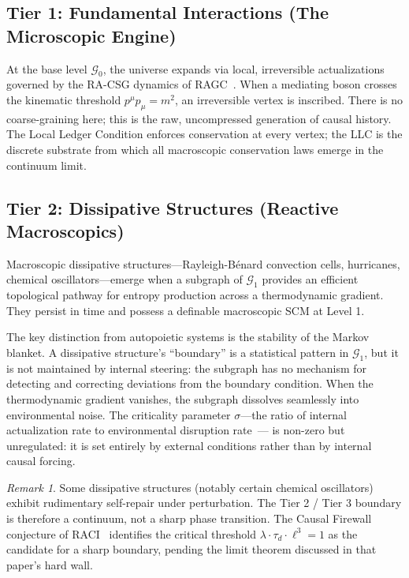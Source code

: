 \documentclass[11pt,a4paper]{article}
\theoremstyle{remark}
\newtheorem{remark}[theorem]{Remark}
\newcommand{\GG}{\mathcal{G}}
\newcommand{\sigmaedge}{\sigma}
\begin{document}
\subsection{Tier 1: Fundamental Interactions (The Microscopic Engine)}

At the base level $\GG_0$, the universe expands via local, irreversible
actualizations governed by the RA-CSG dynamics of RAGC~\citep{Sandeman2026b}.
When a mediating boson crosses the kinematic threshold $p^{\mu}p_{\mu} = m^2$,
an irreversible vertex is inscribed. There is no coarse-graining here; this is
the raw, uncompressed generation of causal history. The Local Ledger Condition
enforces conservation at every vertex; the LLC is the discrete substrate from
which all macroscopic conservation laws emerge in the continuum limit.

\subsection{Tier 2: Dissipative Structures (Reactive Macroscopics)}

Macroscopic dissipative structures---Rayleigh-B\'{e}nard convection cells,
hurricanes, chemical oscillators---emerge when a subgraph of $\GG_1$ provides an
efficient topological pathway for entropy production across a thermodynamic
gradient. They persist in time and possess a definable macroscopic SCM at Level 1.

The key distinction from autopoietic systems is the stability of the Markov
blanket. A dissipative structure's ``boundary'' is a statistical pattern in
$\GG_1$, but it is not maintained by internal steering: the subgraph has no
mechanism for detecting and correcting deviations from the boundary condition.
When the thermodynamic gradient vanishes, the subgraph dissolves seamlessly into
environmental noise. The criticality parameter $\sigmaedge$---the ratio of
internal actualization rate to environmental disruption rate~\citep{Sandeman2026c}---
is non-zero but unregulated: it is set entirely by external conditions rather than
by internal causal forcing.

\begin{remark}
Some dissipative structures (notably certain chemical oscillators) exhibit
rudimentary self-repair under perturbation. The Tier 2 / Tier 3 boundary is
therefore a continuum, not a sharp phase transition. The Causal Firewall conjecture
of RACI~\citep{Sandeman2026c} identifies the critical threshold
$\lambda \cdot \tau_d \cdot \ell^3 = 1$ as the candidate for a sharp boundary,
pending the limit theorem discussed in that paper's hard wall.
\end{remark}
\end{document}
